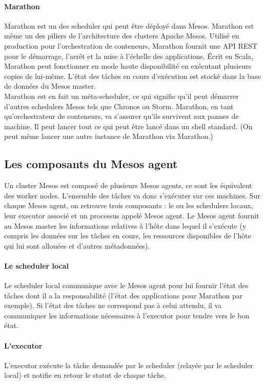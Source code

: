 \documentclass[11pt,fleqn]{book} %
\begin{document}
\paragraph*{Marathon}
Marathon est un des scheduler qui peut être déployé dans Mesos. Marathon est même un des piliers de l'architecture des clusters Apache Mesos. Utilisé en production pour l'orchestration de conteneurs, Marathon fournit une API REST pour le démarrage, l'arrêt et la mise à l'échelle des applications. Écrit en Scala, Marathon peut fonctionner en mode haute disponibilité en exécutant plusieurs copies de lui-même. L'état des tâches en cours d'exécution est stocké dans la base de données du Mesos master.\\

Marathon est en fait un méta-scheduler, ce qui signifie qu'il peut démarrer d'autres schedulers Mesos tels que Chronos ou Storm. Marathon, en tant qu'orchestrateur de conteneurs, va s'assurer qu'ils survivent aux pannes de machine. Il peut lancer tout ce qui peut être lancé dans un shell standard. (On peut même lancer une autre instance de Marathon via Marathon.)

\subsection*{Les composants du Mesos agent}
Un cluster Mesos est composé de plusieurs Mesos agents, ce sont les équivalent des worker nodes. L'ensemble des tâches va donc s'exécuter sur ces machines. Sur chaque Mesos agent, on retrouve trois composants : le ou les schedulers locaux, leur executor associé et un processus appelé Mesos agent. Le Mesos agent fournit au Mesos master les informations relatives à l'hôte dans lequel il s'exécute (y compris les données sur les tâches en cours, les ressources disponibles de l'hôte qui lui sont allouées et d'autres métadonnées).

\paragraph*{Le scheduler local}
Le scheduler local communique avec le Mesos agent pour lui fournir l'état des tâches dont il a la responsabilité (l'état des applications pour Marathon par exemple). Si l'état des tâches ne correspond pas à celui attendu, il va communiquer les informations nécessaires à l'executor pour tendre vers le bon état.

\paragraph*{L'executor}
L'executor exécute la tâche demandée par le scheduler (relayée par le scheduler local) et notifie en retour le statut de chaque tâche.
\end{document}
